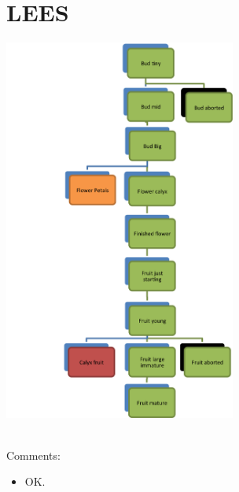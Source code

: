 \documentclass[10pt]{book} %
\begin{document}
\section{LEES}
\begin{multicols}{2}
\includegraphics[width=3in]{LEES.png}
\vfill
\columnbreak

\\
Comments:
\begin{itemize}
\item  OK.
\end{itemize}
\end{multicols}
\clearpage
\newpage
\end{document}
